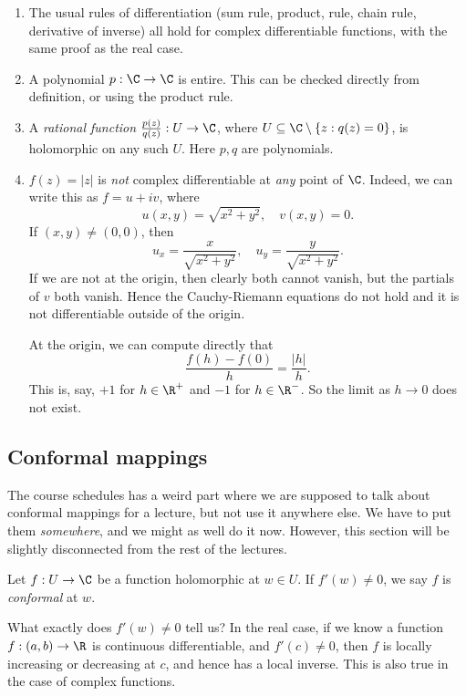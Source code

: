 \documentclass[a4paper]{article}
\begin{document}
\begin{eg}\leavevmode
  \begin{enumerate}
    \item The usual rules of differentiation (sum rule, product, rule, chain rule, derivative of inverse) all hold for complex differentiable functions, with the same proof as the real case.
    \item A polynomial $p: \C \to \C$ is entire. This can be checked directly from definition, or using the product rule.
    \item A \emph{rational function} $\frac{p(z)}{q(z)}: U \to \C$, where $U \subseteq \C \setminus \{z: q(z) = 0\}$, is holomorphic on any such $U$. Here $p, q$ are polynomials.
    \item $f(z) = |z|$ is \emph{not} complex differentiable at \emph{any} point of $\C$. Indeed, we can write this as $f = u + iv$, where
      \[
        u(x, y) = \sqrt{x^2 + y^2},\quad v(x, y) = 0.
      \]
      If $(x, y) \not= (0, 0)$, then
      \[
        u_x = \frac{x}{\sqrt{x^2 + y^2}},\quad u_y = \frac{y}{\sqrt{x^2 + y^2}}.
      \]
      If we are not at the origin, then clearly both cannot vanish, but the partials of $v$ both vanish. Hence the Cauchy-Riemann equations do not hold and it is not differentiable outside of the origin.

      At the origin, we can compute directly that
      \[
        \frac{f(h) - f(0)}{h} = \frac{|h|}{h}.
      \]
      This is, say, $+1$ for $h \in \R^+$ and $-1$ for $h \in \R^-$. So the limit as $h \to 0$ does not exist.
  \end{enumerate}
\end{eg}

\subsection{Conformal mappings}
The course schedules has a weird part where we are supposed to talk about conformal mappings for a lecture, but not use it anywhere else. We have to put them \emph{somewhere}, and we might as well do it now. However, this section will be slightly disconnected from the rest of the lectures.

\begin{defi}
  Let $f: U \to \C$ be a function holomorphic at $w \in U$. If $f'(w) \not= 0$, we say $f$ is \emph{conformal} at $w$.
\end{defi}

What exactly does $f'(w) \not= 0$ tell us? In the real case, if we know a function $f: (a, b) \to \R$ is continuous differentiable, and $f'(c) \not= 0$, then $f$ is locally increasing or decreasing at $c$, and hence has a local inverse. This is also true in the case of complex functions.
\end{document}
